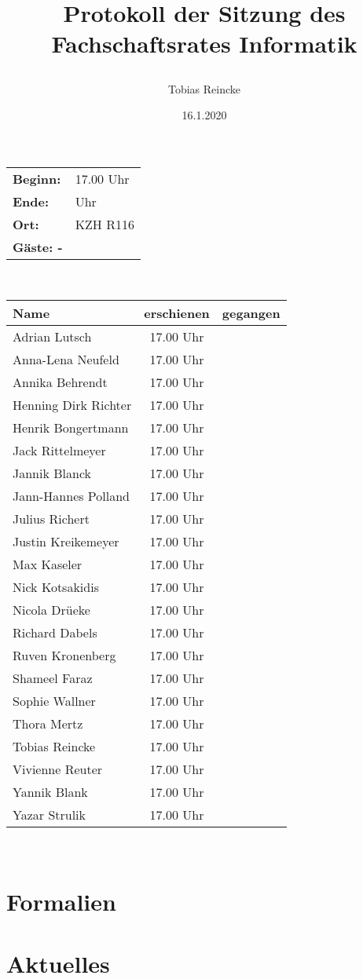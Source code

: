 \documentclass[]{article}
\title{Protokoll der Sitzung des Fachschaftsrates Informatik \date{}}
\author{Tobias Reincke}
\date{16.1.2020}
\begin{document}
\newcommand{\zeit}{17.00 Uhr }
\maketitle


\setlength{\parindent}{0pt} 

\addtolength{\textwidth}{1.0in}
\addtolength{\textheight}{1.00in}
\addtolength{\evensidemargin}{-0.75in}
\addtolength{\oddsidemargin}{-0.75in}
\addtolength{\topmargin}{-.50in}


\begin{tabular}{l l}
	\textbf{Beginn:} &  \zeit\\
	\textbf{Ende:} & Uhr\\
	\textbf{Ort:} & KZH R116\\
	\textbf{Gäste: -}
\end{tabular}\\
\begin{table}[h]
	\centering
	\begin{tabular}{|l|c|c|}
		\hline
		Name & erschienen & gegangen \\
		\hline
		Adrian Lutsch        & \zeit &  \\
		Anna-Lena Neufeld    & \zeit & \\
		Annika Behrendt      & \zeit & \\
		Henning Dirk Richter &\zeit & \\
		Henrik Bongertmann   & \zeit & \\
		Jack Rittelmeyer     & \zeit & \\
		Jannik Blanck & \zeit & \\
		Jann-Hannes Polland  & \zeit &  \\
		
		
		Julius Richert       & \zeit & \\
		Justin Kreikemeyer   & \zeit & \\
		Max Kaseler          & \zeit & \\
		Nick Kotsakidis      & \zeit & \\
		Nicola Drüeke        & \zeit & \\
		Richard Dabels       & \zeit & \\
		Ruven Kronenberg     &\zeit & \\
		Shameel Faraz        & \zeit & \\
		Sophie Wallner       & \zeit & \\
		Thora Mertz          & \zeit &  \\
		Tobias Reincke       & \zeit & \\
		Vivienne Reuter      & \zeit& \\
		Yannik Blank         &\zeit& \\
		Yazar Strulik        &\zeit & \\
		\hline
	\end{tabular}
\end{table}\\
\pagebreak
\tableofcontents


\section{Formalien}
\section{Aktuelles}
\end{document}
